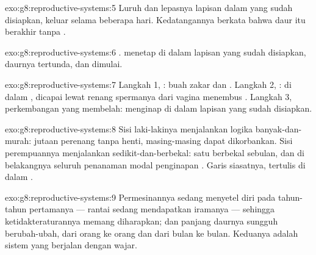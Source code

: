 \begin{solution}{exo:g8:reproductive-systems:5}
Luruh dan lepasnya lapisan dalam  yang sudah
disiapkan, keluar selama beberapa hari. Kedatangannya
berkata bahwa daur itu berakhir tanpa .
\end{solution}

\begin{solution}{exo:g8:reproductive-systems:6}
.  menetap di dalam lapisan yang sudah
disiapkan, daurnya tertunda, dan  dimulai.
\end{solution}

\begin{solution}{exo:g8:reproductive-systems:7}
Langkah 1, : buah zakar dan . Langkah 2,
: di dalam , dicapai lewat renang
spermanya dari vagina menembus . Langkah 3,
perkembangan  yang membelah: menginap di dalam lapisan
 yang sudah disiapkan.
\end{solution}

\begin{solution}{exo:g8:reproductive-systems:8}
Sisi laki-lakinya menjalankan logika banyak-dan-murah:
jutaan perenang tanpa henti, masing-masing dapat
dikorbankan. Sisi perempuannya menjalankan
sedikit-dan-berbekal: satu  berbekal sebulan, dan
di belakangnya seluruh penanaman modal penginapan .
Garis siasatnya, tertulis di dalam .
\end{solution}

\begin{solution}{exo:g8:reproductive-systems:9}
Permesinannya sedang menyetel diri pada tahun-tahun
pertamanya --- rantai  sedang mendapatkan iramanya
--- sehingga ketidakteraturannya memang diharapkan; dan
panjang daurnya sungguh berubah-ubah, dari orang ke orang
dan dari bulan ke bulan. Keduanya adalah sistem yang berjalan
dengan wajar.
\end{solution}

